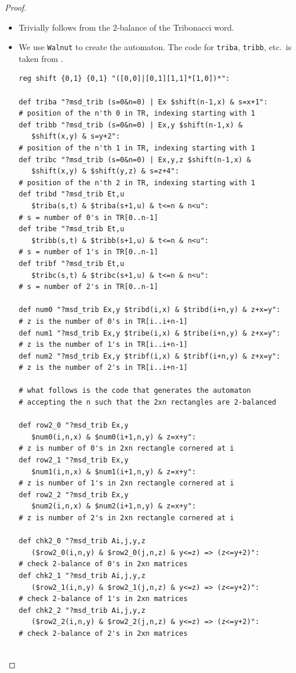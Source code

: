 \documentclass[final]{dmtcs-episciences}
\theoremstyle{plain}
\theoremstyle{remark}
\begin{document}
\begin{proof}
\leavevmode
\begin{itemize}
    \item[(a)] Trivially follows from the $2$-balance of the Tribonacci word.
    \item[(b)] We use {\tt Walnut} to create the automaton.  The code for {\tt triba}, {\tt tribb}, etc.\ is taken from \citet[\S 10.12]{Shallit:2023}.
\begin{verbatim}
reg shift {0,1} {0,1} "([0,0]|[0,1][1,1]*[1,0])*":

def triba "?msd_trib (s=0&n=0) | Ex $shift(n-1,x) & s=x+1":
# position of the n'th 0 in TR, indexing starting with 1
def tribb "?msd_trib (s=0&n=0) | Ex,y $shift(n-1,x) &
   $shift(x,y) & s=y+2":
# position of the n'th 1 in TR, indexing starting with 1
def tribc "?msd_trib (s=0&n=0) | Ex,y,z $shift(n-1,x) &
   $shift(x,y) & $shift(y,z) & s=z+4":
# position of the n'th 2 in TR, indexing starting with 1
def tribd "?msd_trib Et,u 
   $triba(s,t) & $triba(s+1,u) & t<=n & n<u":
# s = number of 0's in TR[0..n-1]
def tribe "?msd_trib Et,u 
   $tribb(s,t) & $tribb(s+1,u) & t<=n & n<u":
# s = number of 1's in TR[0..n-1]
def tribf "?msd_trib Et,u 
   $tribc(s,t) & $tribc(s+1,u) & t<=n & n<u":
# s = number of 2's in TR[0..n-1]

def num0 "?msd_trib Ex,y $tribd(i,x) & $tribd(i+n,y) & z+x=y":
# z is the number of 0's in TR[i..i+n-1]
def num1 "?msd_trib Ex,y $tribe(i,x) & $tribe(i+n,y) & z+x=y":
# z is the number of 1's in TR[i..i+n-1]
def num2 "?msd_trib Ex,y $tribf(i,x) & $tribf(i+n,y) & z+x=y":
# z is the number of 2's in TR[i..i+n-1]

# what follows is the code that generates the automaton 
# accepting the n such that the 2xn rectangles are 2-balanced

def row2_0 "?msd_trib Ex,y 
   $num0(i,n,x) & $num0(i+1,n,y) & z=x+y":
# z is number of 0's in 2xn rectangle cornered at i
def row2_1 "?msd_trib Ex,y 
   $num1(i,n,x) & $num1(i+1,n,y) & z=x+y":
# z is number of 1's in 2xn rectangle cornered at i
def row2_2 "?msd_trib Ex,y 
   $num2(i,n,x) & $num2(i+1,n,y) & z=x+y":
# z is number of 2's in 2xn rectangle cornered at i

def chk2_0 "?msd_trib Ai,j,y,z 
   ($row2_0(i,n,y) & $row2_0(j,n,z) & y<=z) => (z<=y+2)":
# check 2-balance of 0's in 2xn matrices
def chk2_1 "?msd_trib Ai,j,y,z 
   ($row2_1(i,n,y) & $row2_1(j,n,z) & y<=z) => (z<=y+2)":
# check 2-balance of 1's in 2xn matrices
def chk2_2 "?msd_trib Ai,j,y,z 
   ($row2_2(i,n,y) & $row2_2(j,n,z) & y<=z) => (z<=y+2)":
# check 2-balance of 2's in 2xn matrices


\end{verbatim}
\end{itemize}
\end{proof}
\end{document}
